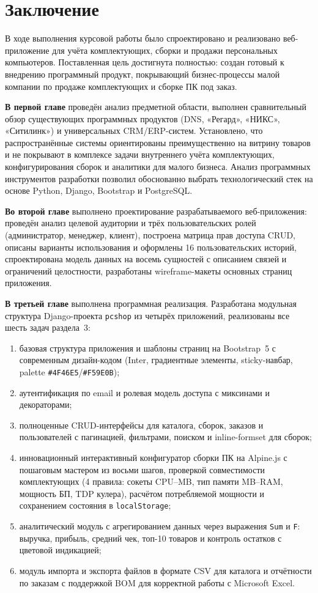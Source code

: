 \section*{Заключение}

В ходе выполнения курсовой работы было спроектировано и реализовано веб-приложение для учёта комплектующих, сборки и продажи персональных компьютеров. Поставленная цель достигнута полностью: создан готовый к внедрению программный продукт, покрывающий бизнес-процессы малой компании по продаже комплектующих и сборке ПК под заказ.

\textbf{В первой главе} проведён анализ предметной области, выполнен сравнительный обзор существующих программных продуктов (DNS, «Регард», «НИКС», «Ситилинк») и универсальных CRM/ERP-систем. Установлено, что распространённые системы ориентированы преимущественно на витрину товаров и не покрывают в комплексе задачи внутреннего учёта комплектующих, конфигурирования сборок и аналитики для малого бизнеса. Анализ программных инструментов разработки позволил обоснованно выбрать технологический стек на основе Python, Django, Bootstrap и PostgreSQL.

\textbf{Во второй главе} выполнено проектирование разрабатываемого веб-приложения: проведён анализ целевой аудитории и трёх пользовательских ролей (администратор, менеджер, клиент), построена матрица прав доступа CRUD, описаны варианты использования и оформлены 16 пользовательских историй, спроектирована модель данных на восемь сущностей с описанием связей и ограничений целостности, разработаны wireframe-макеты основных страниц приложения.

\textbf{В третьей главе} выполнена программная реализация. Разработана модульная структура Django-проекта \texttt{pcshop} из четырёх приложений, реализованы все шесть задач раздела~3:
\begin{enumerate}
    \item базовая структура приложения и шаблоны страниц на Bootstrap~5 с современным дизайн-кодом (Inter, градиентные элементы, sticky-навбар, palette \texttt{\#4F46E5}/\texttt{\#F59E0B});
    \item аутентификация по email и ролевая модель доступа с миксинами и декораторами;
    \item полноценные CRUD-интерфейсы для каталога, сборок, заказов и пользователей с пагинацией, фильтрами, поиском и inline-formset для сборок;
    \item инновационный интерактивный конфигуратор сборки ПК на Alpine.js с пошаговым мастером из восьми шагов, проверкой совместимости комплектующих (4 правила: сокеты CPU--MB, тип памяти MB--RAM, мощность БП, TDP кулера), расчётом потребляемой мощности и сохранением состояния в \texttt{localStorage};
    \item аналитический модуль с агрегированием данных через выражения \texttt{Sum} и \texttt{F}: выручка, прибыль, средний чек, топ-10 товаров и контроль остатков с цветовой индикацией;
    \item модуль импорта и экспорта файлов в формате CSV для каталога и отчётности по заказам с поддержкой BOM для корректной работы с Microsoft Excel.
\end{enumerate}

